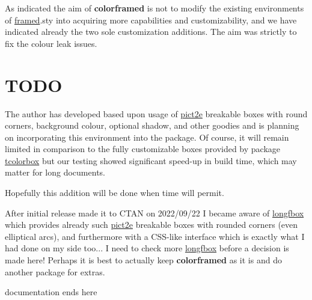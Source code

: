 \documentclass[a4paper,dvipdfmx,11pt]{article}
\def\ctanpackage#1{\href{https://ctan.org/pkg/#1}{#1}}
\newcommand\colorframed{%
        \texorpdfstring{{\color{joli}\bfseries colorframed}}{colorframed}\xspace}
\begin{document}
As indicated the aim of \colorframed is not to modify the
existing environments of \ctanpackage{framed}.sty into
acquiring more capabilities and customizability, and we have
indicated already the two sole customization additions. The aim
was strictly to fix the colour leak issues.

\section{TODO}

The author has developed based upon usage of
\ctanpackage{pict2e} breakable boxes with round corners,
background colour, optional shadow, and other goodies and is
planning on incorporating this environment into the package.
%
Of course, it will remain limited in comparison to the fully
customizable boxes provided by package \ctanpackage{tcolorbox}
but our testing showed significant speed-up in build time, which
may matter for long documents.

Hopefully this addition will be done when time will permit.

\thispagestyle{empty}
\enlargethispage{3\baselineskip}

\footnotesize After initial release made it to CTAN on 2022/09/22
I became aware of \ctanpackage{longfbox} which provides already
such \ctanpackage{pict2e} breakable boxes with rounded corners
(even elliptical arcs), and furthermore with a CSS-like interface
which is exactly what I had done on my side too... I need to check
more \ctanpackage{longfbox} before a decision is made here!
Perhaps it is best to actually keep \colorframed as it is and do
another package for extras.

\centerline{\hrulefill documentation ends here\hrulefill}
\end{document}
